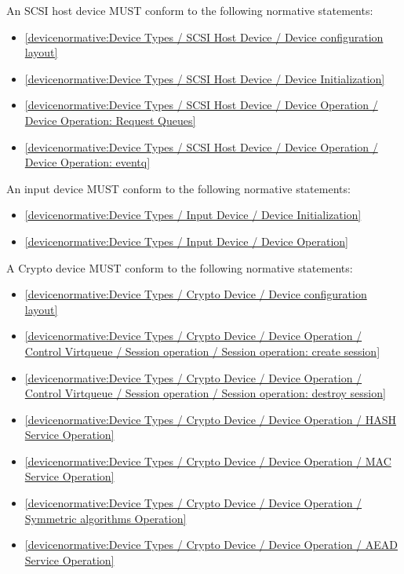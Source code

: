 An SCSI host device MUST conform to the following normative statements:

\begin{itemize}
\item \ref{devicenormative:Device Types / SCSI Host Device / Device configuration layout}
\item \ref{devicenormative:Device Types / SCSI Host Device / Device Initialization}
\item \ref{devicenormative:Device Types / SCSI Host Device / Device Operation / Device Operation: Request Queues}
\item \ref{devicenormative:Device Types / SCSI Host Device / Device Operation / Device Operation: eventq}
\end{itemize}

\label{sec:Conformance / Device Conformance / Input Device Conformance}

An input device MUST conform to the following normative statements:

\begin{itemize}
\item \ref{devicenormative:Device Types / Input Device / Device Initialization}
\item \ref{devicenormative:Device Types / Input Device / Device Operation}
\end{itemize}

\label{sec:Conformance / Device Conformance / Crypto Device Conformance}

A Crypto device MUST conform to the following normative statements:

\begin{itemize}
\item \ref{devicenormative:Device Types / Crypto Device / Device configuration layout}
\item \ref{devicenormative:Device Types / Crypto Device / Device Operation / Control Virtqueue / Session operation / Session operation: create session}
\item \ref{devicenormative:Device Types / Crypto Device / Device Operation / Control Virtqueue / Session operation / Session operation: destroy session}
\item \ref{devicenormative:Device Types / Crypto Device / Device Operation / HASH Service Operation}
\item \ref{devicenormative:Device Types / Crypto Device / Device Operation / MAC Service Operation}
\item \ref{devicenormative:Device Types / Crypto Device / Device Operation / Symmetric algorithms Operation}
\item \ref{devicenormative:Device Types / Crypto Device / Device Operation / AEAD Service Operation}
\end{itemize}

